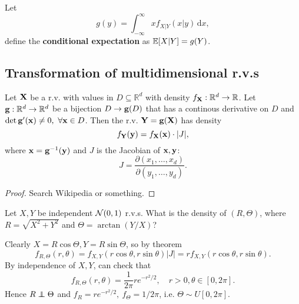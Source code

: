\begin{definition}
    Let 
    \[
        g(y)=\int_{-\infty}^{\infty} xf_{X|Y}(x|y) \,\mathrm{d}x,
    \]
    define the \textbf{conditional expectation} as $ {\mathbb{E}}[X|Y]=g(Y) $.
\end{definition}

\subsection{Transformation of multidimensional r.v.s}
\begin{theorem}
    Let ${\bf X}$ be a r.v. with values in $ D \subseteq \mathbb{R}^{d} $ with density $ f_{\bf X}: \mathbb{R}^{d}\to \mathbb{R} $. Let ${\bf g}: \mathbb{R}^{d}\to \mathbb{R}^{d}$ be a bijection $ D \to {\bf g}(D) $ that has a continous derivative on $D$ and $ \det \bfg'(\bfx)\neq 0,\ \forall \bfx\in D $. Then the r.v. $ {\bf Y}={\bf g}({\bf X}) $ has density 
    \[
        f_{\bf Y}({\bf y}) = f_{\bf X}({\bf x}) \cdot |J|,
    \]
    where $ {\bf x}={\bf g}^{-1}({\bf y}) $ and $J$ is the Jacobian of $ {\bf x},{\bf y} $:
    \[
        J = \frac{\partial (x_1,\dots,x_d)}{\partial (y_1,\dots, y_d)}.
    \]
\end{theorem}
\begin{proof}
    Search Wikipedia or something.
\end{proof}

\begin{example}
    Let $ X,Y $ be independent $ {\mathcal{N}}(0,1) $ r.v.s. What is the density of $ (R,\Theta) $, where $ R=\sqrt{X^2+Y^2} $ and $ \Theta = \arctan (Y/X) $?
    \begin{center}
    \end{center}
    Clearly $ X=R \cos \Theta,Y=R \sin \Theta $, so by theorem 
    \[
        f_{R,\Theta}(r,\theta) = f_{X,Y}(r \cos \theta,r \sin \theta)|J|=rf_{X,Y}(r \cos \theta,r \sin \theta).
    \]
    By independence of $ X,Y $, can check that 
    \[
        f_{R,\Theta}(r,\theta) = \frac{1}{2\pi}re^{-r^2/2},\quad r>0, \theta\in [0,2\pi].
    \]
    Hence $R \independent \Theta$ and $ f_R=re^{-r^2/2},\ f_\Theta=1/2\pi $, i.e. $ \Theta \sim U[0,2\pi] $.
\end{example}
